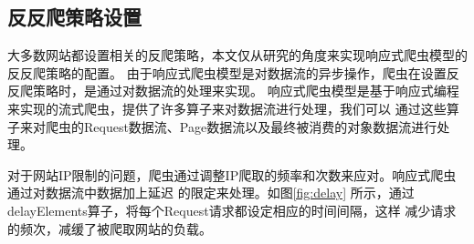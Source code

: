 \documentclass[master]{njuthesis}
\begin{document}



\subsection{反反爬策略设置}\label{section-anti}
大多数网站都设置相关的反爬策略，本文仅从研究的角度来实现响应式爬虫模型的反反爬策略的配置。
由于响应式爬虫模型是对数据流的异步操作，爬虫在设置反反爬策略时，是通过对数据流的处理来实现。
响应式爬虫模型是基于响应式编程来实现的流式爬虫，提供了许多算子来对数据流进行处理，我们可以
通过这些算子来对爬虫的Request数据流、Page数据流以及最终被消费的对象数据流进行处理。

对于网站IP限制的问题，爬虫通过调整IP爬取的频率和次数来应对。响应式爬虫通过对数据流中数据加上延迟
的限定来处理。如图\ref{fig:delay} 所示，通过delayElements算子，将每个Request请求都设定相应的时间间隔，这样
减少请求的频次，减缓了被爬取网站的负载。
\end{document}
